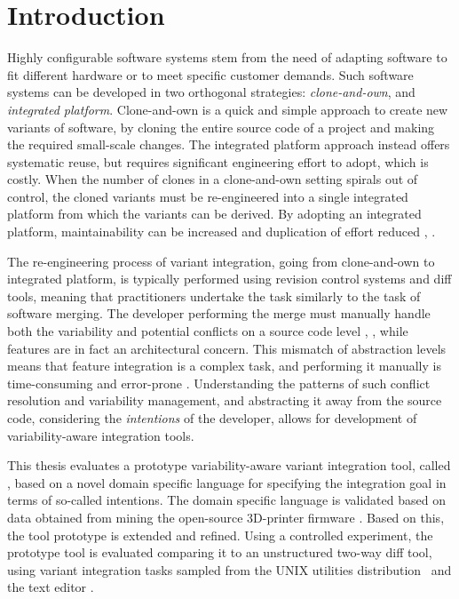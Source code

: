 \chapter{Introduction}
Highly configurable software systems stem from the need of adapting software to fit different hardware or to meet specific customer demands. Such software systems can be developed in two orthogonal strategies: \textit{clone-and-own}, and \textit{integrated platform}. Clone-and-own is a quick and simple approach to create new variants of software, by cloning the entire source code of a project and making the required small-scale changes. The integrated platform approach instead offers systematic reuse, but requires significant engineering effort to adopt, which is costly. When the number of clones in a clone-and-own setting spirals out of control, the cloned variants must be re-engineered into a single integrated platform from which the variants can be derived. By adopting an integrated platform, maintainability can be increased and duplication of effort reduced \cite{schmorleiz2016similarity}, \cite{stanciulescu2015}.

The re-engineering process of variant integration, going from clone-and-own to integrated platform, is typically performed using revision control systems and diff tools, meaning that practitioners undertake the task similarly to the task of software merging. The developer performing the merge must manually handle both the variability and potential conflicts on a source code level \cite{mens2002}, \cite{apel2011}, while features are in fact an architectural concern. This mismatch of abstraction levels means that feature integration is a complex task, and performing it manually is time-consuming and error-prone \cite{melo2016latin}. Understanding the patterns of such conflict resolution and variability management, and abstracting it away from the source code, considering the \textit{intentions} of the developer, allows for development of variability-aware integration tools.

This thesis evaluates a prototype variability-aware variant integration tool, called \tooln, based on a novel domain specific language for specifying the integration goal in terms of so-called intentions.
The domain specific language is validated based on data obtained from mining the open-source 3D-printer firmware \marlin. Based on this, the tool prototype is extended and refined. Using a controlled experiment, the prototype tool is evaluated comparing it to an unstructured two-way diff tool, using variant integration tasks sampled from the UNIX utilities distribution \busybox~and the text editor \vim.

